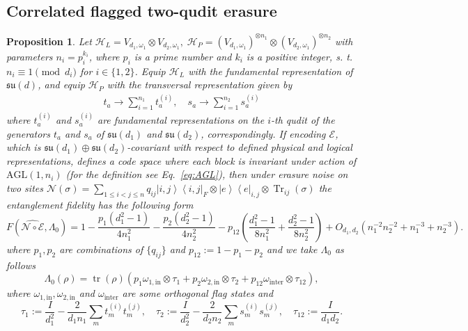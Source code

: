 \documentclass[10pt,twocolumn,superscriptaddress,aps,amsmath,amssymb,citeautoscript,floatfix,prx]{revtex4-2}
\theoremstyle{plain}
\theoremstyle{plain}
\theoremstyle{plain}
\theoremstyle{plain}
\theoremstyle{plain}
\theoremstyle{plain}
\theoremstyle{plain}
\newtheorem{smproposition}[smtheorem]{Proposition}
\theoremstyle{definition}
\theoremstyle{plain}
\begin{document}
\begin{appendix}
\subsection{Correlated flagged two-qudit erasure}\label{subsec:supple_block_enc_noise}

\begin{smproposition}\label{prop:two_block_fidelity}
    Let
    $
        \mathcal H_L=V_{d_1, \omega_1}\otimes V_{d_2,\omega_1},\;
        \mathcal H_P=(V_{d_1,\omega_1})^{\otimes n_1}\otimes (V_{d_2,\omega_1})^{\otimes n_2}
    $
    with parameters $n_i=p_i^{k_i}$, where $p_i$ is a prime number and $k_i$ is a positive integer, s. t. $n_i\equiv 1 \pmod{d_i}$ for $i\in\{1,2\}$.
    Equip \(\mathcal H_L\) with the fundamental representation of
    \(\mathfrak{su}(d)\), and equip \(\mathcal H_P\) with the transversal
    representation given by
    \begin{equation}
    \begin{gathered}
    t_a \rightarrow \sum_{i=1}^{n_1} t_a^{(i)}, \quad s_a \rightarrow \sum_{i=1}^{n_2} s_a^{(i)}
    \end{gathered}
    \end{equation} 
    where $t_a^{(i)}$ and $s_a^{(i)}$ are fundamental representations on the $i$-th qudit of the generators $t_a$ and $s_a$ of $\mathfrak{su}(d_1)$ and $\mathfrak{su}(d_2)$, correspondingly. 
    If encoding $\mathcal{E}$, which is $\mathfrak{su}(d_1)\oplus\mathfrak{su}(d_2)$-covariant with respect to defined physical and logical representations, defines a code space where each block is invariant under action of $\mathrm{AGL}(1, n_i)$ (for the definition see Eq.~\eqref{eq:AGL}),
then under erasure noise on two sites $\mathcal{N}(\sigma)=\sum_{1 \leq i<j \leq n} q_{i j} \left|i, j\right\rangle\left\langle i, j\right|_F \otimes \left| e\right\rangle\left\langle e\right|_{i, j} \otimes \operatorname{Tr}_{i j}(\sigma)$ the entanglement fidelity has the following form
\[
    F\left(\widehat{\mathcal{N} \circ \mathcal{E}}, \Lambda_0\right)=1-\frac{p_1(d_1^2-1)}{4n_1^2}-\frac{p_2(d_2^2-1)}{4n_2^2}-p_{12}\left(\frac{d_1^2-1}{8n_1^2}+\frac{d_2^2-1}{8n_2^2}\right)+O_{d_1,d_2}\!\left(n_1^{-2}n_2^{-2}+n_1^{-3}+n_2^{-3}\right).
\]
where $p_1, p_2$ are combinations of $\{q_{ij}\}$ and $p_{12}:=1-p_1-p_2$ and we take $\Lambda_0$ as follows
\begin{equation}\label{eq:Lambda0_block}
    \Lambda_0(\rho)=\operatorname{tr}(\rho) \left(p_1\omega_{1, \text{in}} \otimes \tau_1+p_2\omega_{2, \text{in}} \otimes \tau_2+p_{12}\omega_{\text{inter}} \otimes \tau_{12}\right),
\end{equation}
where $\omega_{1, \text{in}}, \omega_{2, \text{in}}$ and $\omega_{\text{inter}}$ are some orthogonal flag states and
\begin{equation}\label{eq:omega_block}
    \tau_1:=\frac{I}{d_1^2}-\frac{2}{d_1 n_1} \sum_m t_m^{(i)} t_m^{(j)}, \quad \tau_2:=\frac{I}{d_2^2}-\frac{2}{d_2 n_2} \sum_m s_m^{(i)} s_m^{(j)}, \quad \tau_{12}:=\frac{I}{d_1 d_2}.
\end{equation}
\end{smproposition}


\end{appendix}
\end{document}
